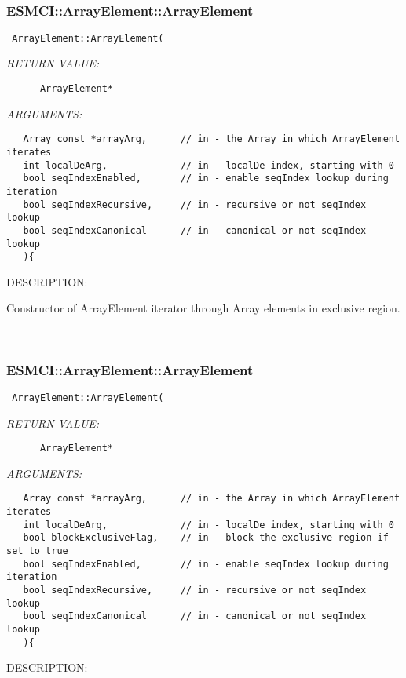  
\mbox{}\hrulefill\
 
\subsubsection [ESMCI::ArrayElement::ArrayElement] {ESMCI::ArrayElement::ArrayElement}


  
\begin{verbatim} ArrayElement::ArrayElement(\end{verbatim}{\em RETURN VALUE:}
\begin{verbatim}      ArrayElement*\end{verbatim}{\em ARGUMENTS:}
\begin{verbatim}   Array const *arrayArg,      // in - the Array in which ArrayElement iterates
   int localDeArg,             // in - localDe index, starting with 0
   bool seqIndexEnabled,       // in - enable seqIndex lookup during iteration
   bool seqIndexRecursive,     // in - recursive or not seqIndex lookup
   bool seqIndexCanonical      // in - canonical or not seqIndex lookup
   ){\end{verbatim}
{\sf DESCRIPTION:\\ }


      Constructor of ArrayElement iterator through Array elements in exclusive
      region.
   
 
\mbox{}\hrulefill\
 
\subsubsection [ESMCI::ArrayElement::ArrayElement] {ESMCI::ArrayElement::ArrayElement}


  
\begin{verbatim} ArrayElement::ArrayElement(\end{verbatim}{\em RETURN VALUE:}
\begin{verbatim}      ArrayElement*\end{verbatim}{\em ARGUMENTS:}
\begin{verbatim}   Array const *arrayArg,      // in - the Array in which ArrayElement iterates
   int localDeArg,             // in - localDe index, starting with 0
   bool blockExclusiveFlag,    // in - block the exclusive region if set to true
   bool seqIndexEnabled,       // in - enable seqIndex lookup during iteration
   bool seqIndexRecursive,     // in - recursive or not seqIndex lookup
   bool seqIndexCanonical      // in - canonical or not seqIndex lookup
   ){\end{verbatim}
{\sf DESCRIPTION:\\ }


